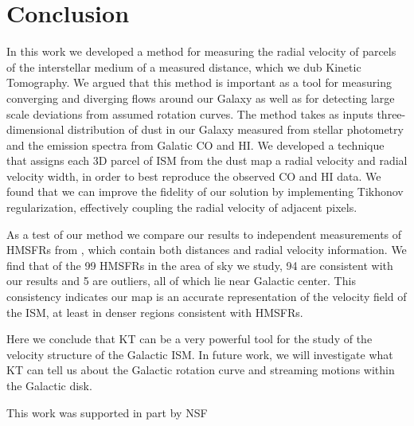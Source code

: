 \section{Conclusion}
\label{sec:conclusion}

In this work we developed a method for measuring the radial velocity of parcels of the interstellar medium of a measured distance, which we dub  Kinetic Tomography. We argued that this method is important as a tool for measuring converging and diverging flows around our Galaxy as well as for detecting large scale deviations from assumed rotation curves. The method takes as inputs three-dimensional distribution of dust in our Galaxy measured from stellar photometry and the emission spectra from Galatic CO and HI. We developed a technique that assigns each 3D parcel of ISM from the dust map a radial velocity and radial velocity width, in order to best reproduce the observed CO and HI data. We found that we can improve the fidelity of our solution by implementing Tikhonov regularization, effectively coupling the radial velocity of adjacent pixels. 

As a test of our method we compare our results to independent measurements of HMSFRs from \Reid{}, which contain both distances and radial velocity information. We find that of the 99 HMSFRs in the area of sky we study, 94 are consistent with our results and 5 are outliers, all of which lie near Galactic center. This consistency indicates our map is an accurate representation of the velocity field of the ISM, at least in denser regions consistent with HMSFRs. 

Here we conclude that KT can be a very powerful tool for the study of the velocity structure of the Galactic ISM. In future work, we will investigate what KT can tell us about the Galactic rotation curve and streaming motions within the Galactic disk. 

\Acknowledgements

This work was supported in part by NSF


